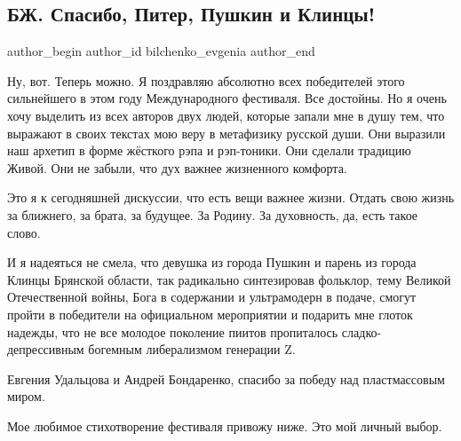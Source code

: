  
 
 
 
 
 
\subsection{БЖ. Спасибо, Питер, Пушкин и Клинцы!}
\label{sec:25_05_2021.fb.bilchenko_evgenia.4.spasibo_piter_pushkin_i_klincy}
\ifcmt
 author_begin
   author_id bilchenko_evgenia
 author_end
\fi

Ну, вот. Теперь можно. Я поздравляю абсолютно всех победителей этого
сильнейшего в этом году Международного фестиваля. Все достойны. Но я очень хочу
выделить из всех авторов двух людей, которые запали мне в душу тем, что
выражают в своих текстах мою веру в метафизику русской души. Они выразили наш
архетип в форме жёсткого рэпа и рэп-тоники. Они сделали традицию Живой. Они не
забыли, что дух важнее жизненного комфорта. 

Это я к сегодняшней дискуссии, что есть вещи важнее жизни. Отдать свою жизнь за
ближнего, за брата, за будущее. За Родину. За духовность, да, есть такое слово.


И я надеяться не смела, что девушка из города Пушкин и парень из города Клинцы
Брянской области, так радикально синтезировав фольклор, тему Великой
Отечественной войны, Бога в содержании и ультрамодерн в подаче, смогут пройти в
победители на официальном мероприятии и подарить мне глоток надежды, что не все
молодое поколение пиитов пропиталось сладко-депрессивным богемным либерализмом
генерации Z. 

Евгения Удальцова и Андрей Бондаренко, спасибо за победу над пластмассовым миром. 

Мое любимое стихотворение фестиваля привожу ниже. Это мой личный выбор.

